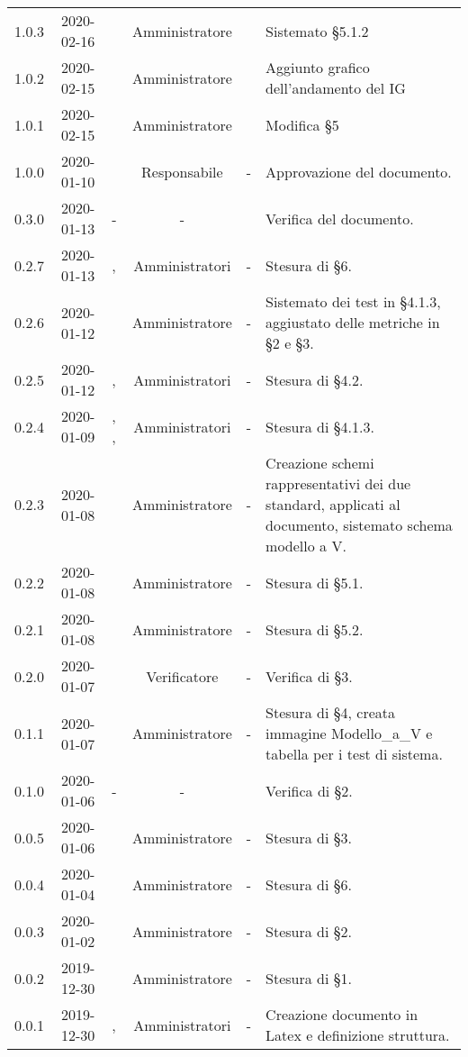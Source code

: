 {\begin{longtable}{ c c  C{2.5cm} c c C{3.5cm}}
1.0.3 & 2020-02-16 & \PF{} & Amministratore & \AT{} & Sistemato §5.1.2\\
1.0.2 & 2020-02-15 & \PF{} & Amministratore & \AT{} & Aggiunto grafico dell'andamento del IG \\
1.0.1 & 2020-02-15 & \PF{} & Amministratore & \AT{} & Modifica §5 \\
1.0.0 & 2020-01-10 & \SE{} & Responsabile & - & Approvazione del documento. \\
0.3.0 & 2020-01-13 & - & - & \LD{} & Verifica del documento. \\
0.2.7 & 2020-01-13 & \MC{}, \AT{} & Amministratori & - & Stesura di §6. \\
0.2.6 & 2020-01-12 & \AT{} & Amministratore & - & Sistemato dei test in §4.1.3, aggiustato delle metriche in §2 e §3. \\
0.2.5 & 2020-01-12 & \MC{}, \BR{} & Amministratori & - & Stesura di §4.2. \\
0.2.4 & 2020-01-09 & \MC{}, \AT{}, \BR{} & Amministratori & - & Stesura di §4.1.3. \\
0.2.3 & 2020-01-08 & \AT{} & Amministratore & - & Creazione schemi rappresentativi dei due standard, applicati al documento, sistemato schema modello a V. \\
0.2.2 & 2020-01-08 & \MC{} & Amministratore & - & Stesura di §5.1. \\
0.2.1 & 2020-01-08 & \AT{} & Amministratore & - & Stesura di §5.2. \\
0.2.0 & 2020-01-07 & \DF{} & Verificatore & - & Verifica di §3. \\
0.1.1 & 2020-01-07 & \AT{} & Amministratore & - & Stesura di §4, creata immagine Modello\_a\_V e tabella per i test di sistema. \\
0.1.0 & 2020-01-06 & - & - & \LD{} & Verifica di §2. \\
0.0.5 & 2020-01-06 & \BR{} & Amministratore & - & Stesura di §3. \\
0.0.4 & 2020-01-04 & \MC{} & Amministratore & - & Stesura di §6. \\
0.0.3 & 2020-01-02 & \MC{} & Amministratore & - & Stesura di §2. \\
0.0.2 & 2019-12-30 & \AT{} & Amministratore & - & Stesura di §1. \\
0.0.1 & 2019-12-30 & \AT{}, \MC{} & Amministratori & - & Creazione documento in Latex e definizione struttura. \\	
		
\end{longtable}
}
